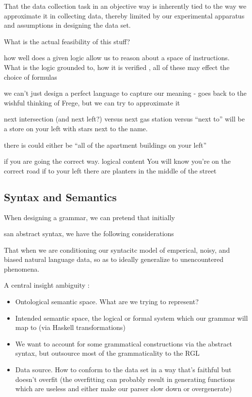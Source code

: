 \documentclass[a4paper, 11pt]{article}
\begin{document}
That the data collection task in an objective way is inherently tied to the way we approximate it in
collecting data, thereby limited by our experimental apparatus and assumptions
in designing the data set.

What is the actual feasibility of this stuff?

how well does a given logic allow us to reason about a space of instructions.
What is the logic grounded to, how it is verified , all of these may effect the
choice of formulas

we can't just design a perfect language to capture our meaning - goes back to
the wishful thinking of Frege, but we can try to approximate it

next intersection (and next left?) versus next gas station versus ``next to''
 will be a store on your left with stars next to the name.

there is could either be 
``all of the apartment buildings on your left''

if you are going the correct way.
logical content
You will know you're on the correct road if to your left there are planters in the middle of the street


\subsection{Syntax and Semantics}

When designing a grammar, we can pretend that initially

san abstract syntax, we have the following considerations

That when we are conditioning our syntacitc model of emperical, noisy, and
biased natural language data, so as to ideally generalize to unencountered
phenomena.

A central insight ambiguity : 


\begin{itemize}
\item Ontological semantic space. What are we trying to represent?
\item Intended semantic space, the logical or formal system which our grammar
  will map to (via Haskell transformations)
\item  We want to account for some grammatical constructions via the abstract syntax, but
  outsource most of the grammaticality to the RGL
\item Data source. How to conform to the data set in a way that's faithful but
  doesn't overfit (the overfitting can probably result in generating functions
  which are useless and either make our parser slow down or overgenerate)
\end{itemize}
\end{document}
